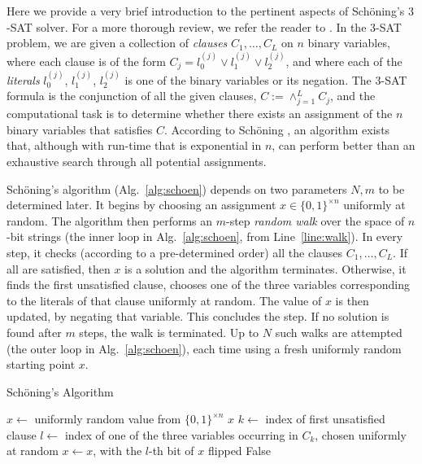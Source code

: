 \documentclass[a4paper,aps,floatfix]{revtex4}
\begin{document}
Here we provide a very brief introduction to the pertinent aspects of Sch\"oning's $3$-SAT solver. 
For a more thorough review, we refer the reader to \cite{Schoening99,SchoeningToranBook}. 
In the $3$-SAT problem, we are given a collection of \emph{clauses} $C_1,\ldots, C_L$ on $n$ binary variables, where each clause is of the form $C_j = l_0^{(j)}\vee l_1^{(j)}\vee l_2^{(j)}$, and where each of the \emph{literals} $l_0^{(j)}$,  $l_1^{(j)}$, $l_2^{(j)}$ is one of the binary variables or its negation. 
The $3$-SAT formula is the conjunction of all the given clauses, $C:= \wedge_{j=1}^{L}C_j$, and the computational task is to determine whether there exists an assignment of the $n$ binary variables that satisfies $C$. 
According to Sch\"oning \cite{Schoening99}, an algorithm exists that, although with run-time that is exponential in $n$, can perform better than an exhaustive search through all potential assignments.  

Sch\"oning's algorithm (Alg.~\ref{alg:schoen}) depends on two parameters $N, m$ to be determined later.
It begins by choosing an assignment $x\in \{0,1\}^{\times n}$ uniformly at random.
The algorithm then performs an $m$-step \emph{random walk} over the space of $n$-bit strings (the inner loop in Alg.~\ref{alg:schoen}, from Line~\ref{line:walk}).
In every step, it checks (according to a pre-determined order) all the clauses $C_1,\ldots, C_L$. 
If all are satisfied, then $x$ is a solution and the algorithm terminates. 
Otherwise, it finds the first unsatisfied clause,
chooses one of the three variables corresponding to the literals of that clause uniformly at random.
The value of $x$ is then updated, by negating that variable. 
This concludes the step.
If no solution is found after $m$ steps, the walk is terminated.
Up to $N$ such walks are attempted (the outer loop in Alg.~\ref{alg:schoen}), each time using a fresh uniformly random starting point $x$.


\begin{algorithm}[H]
	\caption{Sch\"oning's Algorithm}\label{alg:schoen}
	\begin{algorithmic}[1]
				\State $x\leftarrow$ uniformly random value from $\{0,1\}^{\times n}$
				\label{line:walk}
						\State\Return $x$
					\Else
						\State $k\leftarrow$ index of first unsatisfied clause
						\State $l\leftarrow$ index of one of the three variables occurring in $C_k$, chosen uniformly at random
						\State $x\leftarrow x$, with the $l$-th bit of $x$ flipped
					\EndIf
				\EndFor
				\EndFor
			\State \Return False
	\EndFunction
	\end{algorithmic}
\end{algorithm}
\end{document}
